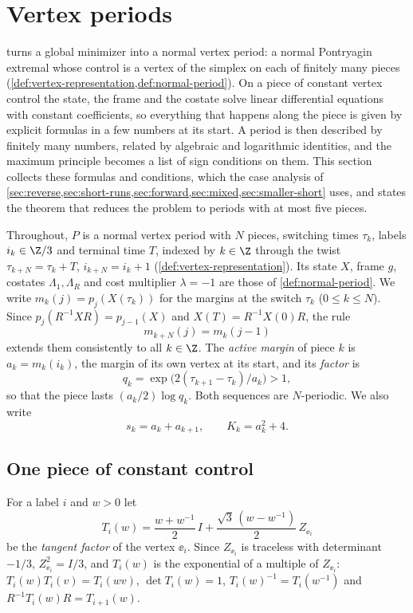 \section{Vertex periods}\label{sec:periods}

 turns a global minimizer into a normal vertex period: a normal
Pontryagin extremal whose control is a vertex of the simplex on each of finitely many pieces
(\cref{def:vertex-representation,def:normal-period}). On a piece of constant vertex control the
state, the frame and the costate solve linear differential equations with constant
coefficients, so everything that happens along the piece is given by explicit formulas in a few
numbers at its start. A period is then described by finitely many numbers, related by algebraic
and logarithmic identities, and the maximum principle becomes a list of sign conditions on
them. This section collects these formulas and conditions, which the case analysis of
\cref{sec:reverse,sec:short-runs,sec:forward,sec:mixed,sec:smaller-short} uses, and states the
theorem that reduces the problem to periods with at most five pieces.

Throughout, $P$ is a normal vertex period with $N$ pieces, switching times $\tau_k$, labels
$i_k\in\Z/3$ and terminal time $T$, indexed by $k\in\Z$ through the twist
$\tau_{k+N}=\tau_k+T$, $i_{k+N}=i_k+1$ (\cref{def:vertex-representation}). Its state $X$, frame
$g$, costates $\Lambda_1,\Lambda_R$ and cost multiplier $\lambda=-1$ are those of
\cref{def:normal-period}. We write $m_k(j)=p_j(X(\tau_k))$ for the margins at the switch
$\tau_k$ ($0\le k\le N$). Since $p_j(R^{-1}XR)=p_{j-1}(X)$ and
$X(T)=R^{-1}X(0)R$, the rule
\begin{equation}\label{eq:per-margin-twist}
  m_{k+N}(j)=m_k(j-1)
\end{equation}
extends them consistently to all $k\in\Z$. The \emph{active
margin} of piece $k$ is $a_k=m_k(i_k)$, the margin of its own vertex at its start, and its
\emph{factor} is
\[
  q_k=\exp\bigl(2(\tau_{k+1}-\tau_k)/a_k\bigr)>1,
\]
so that the piece lasts $(a_k/2)\log q_k$. Both sequences are
$N$-periodic. We also write
\[
  s_k=a_k+a_{k+1},\qquad K_k=a_k^2+4.
\]

\subsection{One piece of constant control}\label{sec:per-one-arc}

For a label $i$ and $w>0$ let
\[
  T_i(w)=\frac{w+w^{-1}}{2}\,I+\frac{\sqrt3\,(w-w^{-1})}{2}\,Z_{\ee_i}
\]
be the \emph{tangent factor} of the vertex $\ee_i$. Since $Z_{\ee_i}$ is traceless with
determinant $-1/3$, $Z_{\ee_i}^2=I/3$, and $T_i(w)$ is the exponential of a multiple of
$Z_{\ee_i}$: $T_i(w)T_i(v)=T_i(wv)$, $\det T_i(w)=1$, $T_i(w)^{-1}=T_i(w^{-1})$ and
$R^{-1}T_i(w)R=T_{i+1}(w)$.

